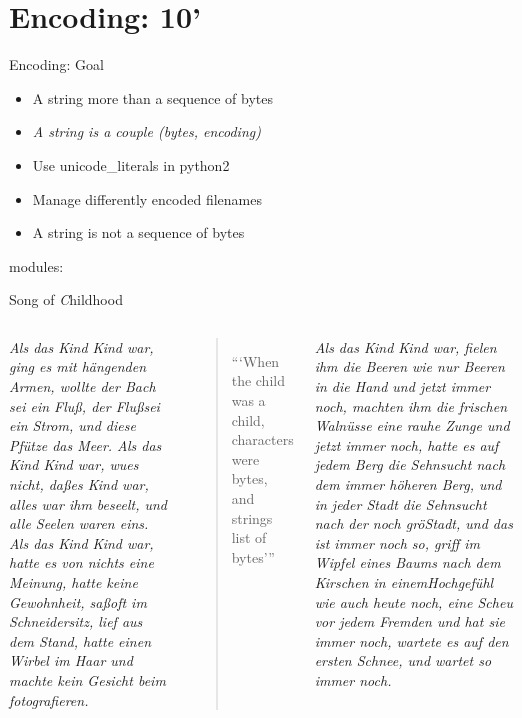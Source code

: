 \section{Encoding: 10'}

\begin{pyframe}{Encoding: Goal}
\Large
\begin{itemize}
\item A string more than a sequence of bytes
\item \emph{A string is a couple (bytes, encoding)}
\item Use unicode\_literals in python2
\item Manage differently encoded filenames 
\item A string is not a sequence of bytes
\end{itemize}
modules: 
\end{pyframe}


\begin{pyframe}{Song of \emph{C}hildhood}
\begin{columns}

\tiny
\textit{Als das Kind Kind war, ging es mit hängenden Armen, 
wollte der Bach sei ein Flu\ss, der Flu\ss sei ein Strom, 
und diese Pf\"utze das Meer.
\newline
Als das Kind Kind war,  wu\sste es nicht, da\ss es Kind war, 
alles war ihm beseelt, und alle Seelen waren eins.
\newline
Als das Kind Kind war, 
hatte es von nichts eine Meinung, 
hatte keine Gewohnheit, 
sa\ss oft im Schneidersitz, 
lief aus dem Stand, 
hatte einen Wirbel im Haar 
und machte kein Gesicht beim fotografieren.
}
\begin{verse}
\begin{center}
\Large
```When the child was a child,\\
\vspace{.5cm}
characters were bytes, and\\
\vspace{.5cm}
strings list of bytes'''
\end{center}
\end{verse}

\tiny \textit{Als das Kind Kind war, 
fielen ihm die Beeren wie nur Beeren in die Hand 
und jetzt immer noch, 
machten ihm die frischen Waln\"usse eine rauhe Zunge 
und jetzt immer noch, 
hatte es auf jedem Berg 
die Sehnsucht nach dem immer h\"oheren Berg, 
und in jeder Stadt 
die Sehnsucht nach der noch gr\"o\sseren Stadt, 
und das ist immer noch so, 
griff im Wipfel eines Baums nach dem Kirschen in einemHochgef\"uhl 
wie auch heute noch, 
eine Scheu vor jedem Fremden 
und hat sie immer noch, 
wartete es auf den ersten Schnee, 
und wartet so immer noch.
}
\end{columns}
\end{pyframe}

